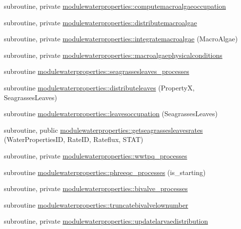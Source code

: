 \begin{DoxyCompactItemize}
subroutine, private \mbox{\hyperlink{namespacemodulewaterproperties_a196db184712b743908b747b05495bc60}{modulewaterproperties\+::computemacroalgaeoccupation}}
\item 
subroutine, private \mbox{\hyperlink{namespacemodulewaterproperties_a45571c439a7d4a05be3b427eb5ff0b9a}{modulewaterproperties\+::distributemacroalgae}}
\item 
subroutine, private \mbox{\hyperlink{namespacemodulewaterproperties_a27e3b4870b21a44136c19ab777be7e33}{modulewaterproperties\+::integratemacroalgae}} (Macro\+Algae)
\item 
subroutine, private \mbox{\hyperlink{namespacemodulewaterproperties_af4c3f5f2d82b97b5112ee2c44f4dc5a3}{modulewaterproperties\+::macroalgaephysicalconditions}}
\item 
subroutine \mbox{\hyperlink{namespacemodulewaterproperties_adf800c8c0d5bdc30d00d4b10c88f9693}{modulewaterproperties\+::seagrassesleaves\+\_\+processes}}
\item 
subroutine \mbox{\hyperlink{namespacemodulewaterproperties_a60f5e5b09c032f11f1b1a75f101398a0}{modulewaterproperties\+::distributeleaves}} (PropertyX, Seagrasses\+Leaves)
\item 
subroutine \mbox{\hyperlink{namespacemodulewaterproperties_ac74bdef93cc8e54e691452462dce15da}{modulewaterproperties\+::leavesoccupation}} (Seagrasses\+Leaves)
\item 
subroutine, public \mbox{\hyperlink{namespacemodulewaterproperties_ae3241f210c7340a59547a54db80870aa}{modulewaterproperties\+::getseagrassesleavesrates}} (Water\+Properties\+ID, Rate\+ID, Rateflux, S\+T\+AT)
\item 
subroutine, private \mbox{\hyperlink{namespacemodulewaterproperties_ad35241441c35aaaf61a0529c6be215e9}{modulewaterproperties\+::wwtpq\+\_\+processes}}
\item 
subroutine \mbox{\hyperlink{namespacemodulewaterproperties_a24e8f85633a4f1ac903cfa366e4669d7}{modulewaterproperties\+::phreeqc\+\_\+processes}} (is\+\_\+starting)
\item 
subroutine, private \mbox{\hyperlink{namespacemodulewaterproperties_aa43273d07b646deb6e4c72e757b19fbd}{modulewaterproperties\+::bivalve\+\_\+processes}}
\item 
subroutine \mbox{\hyperlink{namespacemodulewaterproperties_ab62d1ee17d0bdd78beb327d8dd8c2f4d}{modulewaterproperties\+::truncatebivalvelownumber}}
\item 
subroutine, private \mbox{\hyperlink{namespacemodulewaterproperties_a9362aa51fad7e9cae9cd548057855662}{modulewaterproperties\+::updatelarvaedistribution}}

\end{DoxyCompactItemize}
